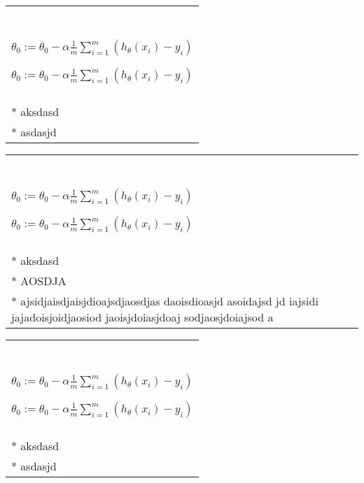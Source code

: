\documentclass[a4paper,12pt,ngerman,fleqn]{article}
\newcommand{\mybox}[3]{
        \centering
        \begin{tabularx}{0.9\textwidth}{|X|}
            \rowcolor{accent}
            \textcolor{white}{\textbf{#1}} \\
            \def\temp{#2}\ifx\temp\empty
                
            \else
                #2 \\ \hline
            \fi
            \\ \hline
            #3
            \\ \hline
        \end{tabularx}
    }
\begin{document}
    
    \setlength{\parindent}{0cm}


    \begin{minipage}[t]{.51\textwidth}
        \vspace{1pt}
        \mybox
            {Section 1}
            {\( \theta_0 := \theta_0 - \alpha \frac{1}{m} \sum\limits_{i=1}^{m}(h_\theta(x_{i}) - y_{i}) \)}
            {
                * aksdasd \\
                * asdasjd
            }
        \newline
        \newline
        \newline
        \mybox
            {Section 2}
            {\( \theta_0 := \theta_0 - \alpha \frac{1}{m} \sum\limits_{i=1}^{m}(h_\theta(x_{i}) - y_{i}) \)}
            {
                * aksdasd \\
                * AOSDJA \\
                * ajsidjaisdjaisjdioajsdjaosdjas daoisdioasjd asoidajsd jd iajsidi jajadoisjoidjaosiod jaoisjdoiasjdoaj sodjaosjdoiajsod a
            }
        \newline
        \newline
        \newline
        \mybox
            {Section 3}
            {\( \theta_0 := \theta_0 - \alpha \frac{1}{m} \sum\limits_{i=1}^{m}(h_\theta(x_{i}) - y_{i}) \)}
            {
                * aksdasd \\
                * asdasjd
            }
        \newline
    \end{minipage}%
\end{document}
